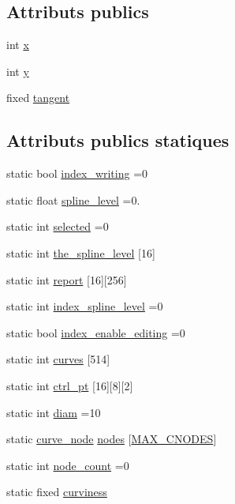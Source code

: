 \subsection*{Attributs publics}
\begin{DoxyCompactItemize}
\item 
int \hyperlink{classcurve__node_aa7ae8f2ee3bbd3e6194785c392751cdb}{x}
\item 
int \hyperlink{classcurve__node_afc1f4f007a920aa79c1f1f0ff0b49465}{y}
\item 
fixed \hyperlink{classcurve__node_a31ea7469070f7bb90ceae073d1d075a6}{tangent}
\end{DoxyCompactItemize}
\subsection*{Attributs publics statiques}
\begin{DoxyCompactItemize}
\item 
static bool \hyperlink{classcurve__node_ae995b9ef63ae5b880d6006083acaf6d3}{index\+\_\+writing} =0
\item 
static float \hyperlink{classcurve__node_a16c72a6637b3b68983b5ce55b90665bf}{spline\+\_\+level} =0.
\item 
static int \hyperlink{classcurve__node_abe017d998cde30d2ca5f7c8ea68ba3da}{selected} =0
\item 
static int \hyperlink{classcurve__node_a62eb9b6b3a24274664775a07c565d39c}{the\+\_\+spline\+\_\+level} \mbox{[}16\mbox{]}
\item 
static int \hyperlink{classcurve__node_a348cce4dfe54130e8b8b2fb218baedfb}{report} \mbox{[}16\mbox{]}\mbox{[}256\mbox{]}
\item 
static int \hyperlink{classcurve__node_af9c0c53bc02942259c36c753232326aa}{index\+\_\+spline\+\_\+level} =0
\item 
static bool \hyperlink{classcurve__node_a4479fff7bfc410d6f6d1df9975261aa8}{index\+\_\+enable\+\_\+editing} =0
\item 
static int \hyperlink{classcurve__node_a0aebfec8e10d7fc02442cd5326433c93}{curves} \mbox{[}514\mbox{]}
\item 
static int \hyperlink{classcurve__node_ab7280e17d47152797e10e5992791ee9b}{ctrl\+\_\+pt} \mbox{[}16\mbox{]}\mbox{[}8\mbox{]}\mbox{[}2\mbox{]}
\item 
static int \hyperlink{classcurve__node_aab45660e4c1077f8742b151fcb0cdcad}{diam} =10
\item 
static \hyperlink{classcurve__node}{curve\+\_\+node} \hyperlink{classcurve__node_affd9362e19ab4c4a70164622a7aebb61}{nodes} \mbox{[}\hyperlink{patch__splines__2_8h_abd21c950f8371229cfca1c4f98c9750f}{M\+A\+X\+\_\+\+C\+N\+O\+D\+E\+S}\mbox{]}
\item 
static int \hyperlink{classcurve__node_a09d4ec4d9b46abddbcec3e0c46f53d3f}{node\+\_\+count} =0
\item 
static fixed \hyperlink{classcurve__node_a46e1f23c6d19a1ca915697c80ed72a84}{curviness}
\end{DoxyCompactItemize}


